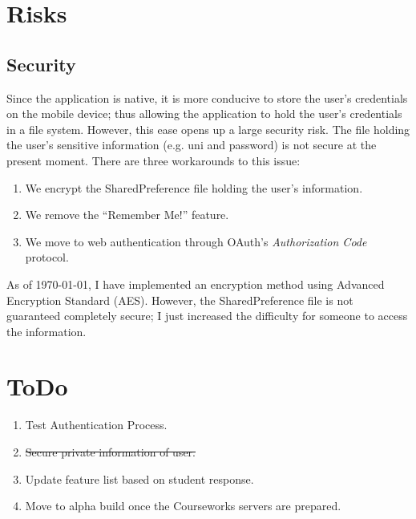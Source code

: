 \documentclass{article}
\begin{document}
\section{Risks}
 \subsection{Security}
Since the application is native, it is more conducive to store the user's credentials on the mobile device; thus allowing the application to hold the user's credentials in a file system. However, this ease opens up a large security risk. The file holding the user's sensitive information (e.g. uni and password) is not secure at the present moment. There are three workarounds to this issue:
  \begin{enumerate}
   \item We encrypt the SharedPreference file holding the user's information.
   \item We remove the ``Remember Me!'' feature.
   \item We move to web authentication through OAuth's \emph{Authorization Code} protocol.
  \end{enumerate}
As of \today, I have implemented an encryption method using Advanced Encryption Standard (AES). However, the SharedPreference file is not guaranteed completely secure; I just increased the difficulty for someone to access the information.

\section{ToDo}
 \begin{enumerate}
  \item Test Authentication Process.
  \item \sout{Secure private information of user.}
  \item Update feature list based on student response.
  \item Move to alpha build once the Courseworks servers are prepared.
 \end{enumerate}
\end{document}
